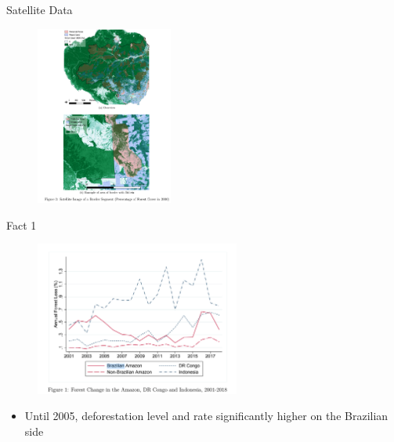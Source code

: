 \documentclass[11pt,notes=hide,aspectratio=169,mathserif]{beamer}
\begin{document}
\begin{frame}{Satellite Data}
\begin{figure}
\centering
\includegraphics[width=0.4\textwidth]{../TA9/inputs/fig2.2.png}
\end{figure}
\end{frame}

\begin{frame}{Fact 1}
\begin{figure}
\centering
\includegraphics[width=0.6\textwidth]{../TA9/inputs/fig2.1.png}
\end{figure}
\begin{itemize}
\item Until 2005, deforestation level and rate significantly higher on the Brazilian side 
\end{itemize}
\end{frame}
\end{document}
